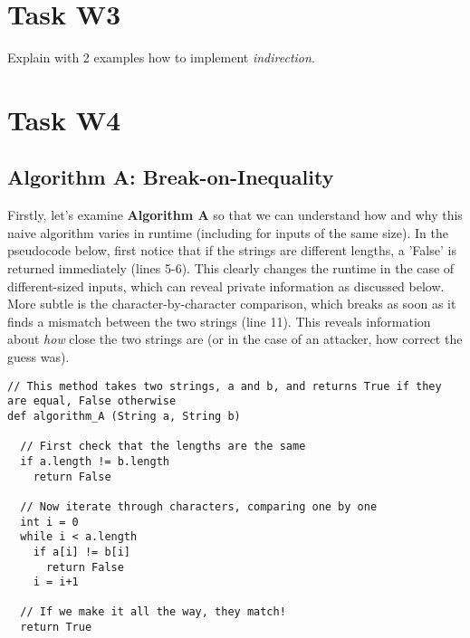 \documentclass{article}
\begin{document}
\section{Task W3}
Explain with 2 examples how to implement \textit{indirection}.

\section{Task W4}
\subsection{Algorithm A: Break-on-Inequality}
Firstly, let's examine \textbf{Algorithm A} so that we can understand how and why this naive algorithm varies in runtime (including for inputs of the same size).
In the pseudocode below, first notice that if the strings are different lengths, a 'False' is returned immediately (lines 5-6).
This clearly changes the runtime in the case of different-sized inputs, which can reveal private information as discussed below.
More subtle is the character-by-character comparison, which breaks as soon as it finds a mismatch between the two strings (line 11). This reveals information about \textit{how} close the two strings are (or in the case of an attacker, how correct the guess was).

\begin{lstlisting}
// This method takes two strings, a and b, and returns True if they are equal, False otherwise
def algorithm_A (String a, String b)

  // First check that the lengths are the same
  if a.length != b.length
    return False

  // Now iterate through characters, comparing one by one
  int i = 0
  while i < a.length
    if a[i] != b[i]
      return False
    i = i+1

  // If we make it all the way, they match!
  return True
\end{lstlisting}
\end{document}
